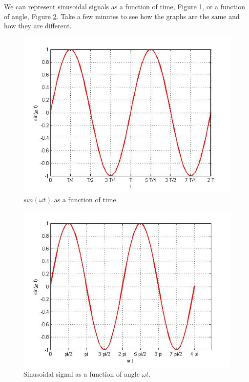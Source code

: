 \documentclass{ximera}
\begin{document}
\begin{definition}
We can represent sinusoidal signals as a function of time, Figure \ref{sin}, or a function of angle, Figure \ref{sinPh}. Take a few minutes to see how the graphs are the same and how they are different.



\begin{figure}[htpb]
\includegraphics[scale=0.4]{../jpg/cpef1.jpg}
\caption{$sin ( \omega t)$ as a function of time.} \label{sin}
\end{figure}




\begin{figure}[htpb]
\includegraphics[scale=0.4]{../jpg/cpef3.jpg}
\caption{Sinusoidal signal as a function of angle $\omega t$.}
\label{sinPh}
\end{figure}

\end{definition}
\end{document}
